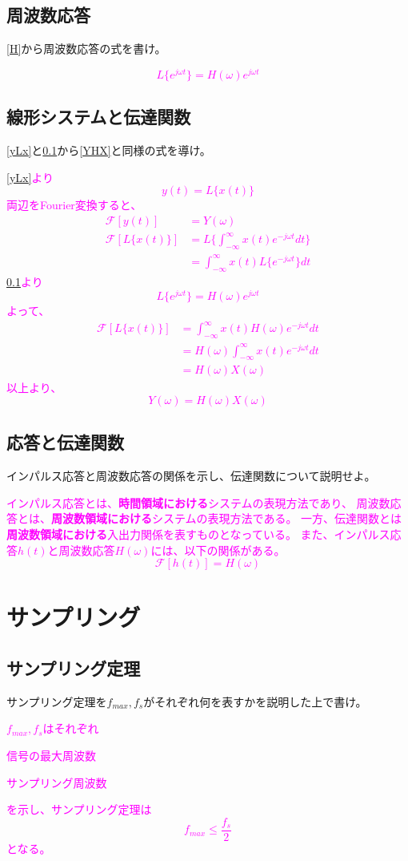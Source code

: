 \documentclass[twocolumn]{ltjsarticle}
\newcommand{\visible}{visible}
\newcommand{\ans}[1]{
\begin{tcolorbox}[\visible]
\textcolor{magenta}{#1}
\end{tcolorbox}
}
\begin{document}
\subsection{周波数応答}\label{He}
\ref{H}から周波数応答の式を書け。
\ans{
    $$L\{e^{j\omega t}\}=H(\omega)e^{j\omega t}$$
}
\subsection{線形システムと伝達関数}
\ref{yLx}と\ref{He}から\ref{YHX}と同様の式を導け。
\ans{
    \ref{yLx}より$$y(t)=L\{x(t)\}$$
    両辺をFourier変換すると、
    \begin{align*}
        \mathcal{F}[y(t)]&=Y(\omega)\\
        \mathcal{F}[L\{x(t)\}]&=L\{\int_{-\infty}^{\infty}x(t)e^{-j\omega t}dt\}\\
        &=\int_{-\infty}^{\infty}x(t)L\{e^{-j\omega t}\}dt
    \end{align*}
    \ref{He}より$$L\{e^{j\omega t}\}=H(\omega)e^{j\omega t}$$
    よって、
    \begin{align*}
        \mathcal{F}[L\{x(t)\}]&=\int_{-\infty}^{\infty}x(t)H(\omega)e^{-j\omega t}dt\\
        &=H(\omega)\int_{-\infty}^{\infty}x(t)e^{-j\omega t}dt\\
        &=H(\omega)X(\omega)
    \end{align*}
    以上より、
    $$Y(\omega)=H(\omega)X(\omega)$$
}
\subsection{応答と伝達関数}
インパルス応答と周波数応答の関係を示し、伝達関数について説明せよ。
\ans{
    インパルス応答とは、\textbf{時間領域における}システムの表現方法であり、
    周波数応答とは、\textbf{周波数領域における}システムの表現方法である。
    一方、伝達関数とは\textbf{周波数領域における}入出力関係を表すものとなっている。
    また、インパルス応答$h(t)$と周波数応答$H(\omega)$には、以下の関係がある。
    $$\mathcal{F}[h(t)]=H(\omega)$$
}
\clearpage
\section{サンプリング}
\subsection{サンプリング定理}
サンプリング定理を$f_{max},f_s$がそれぞれ何を表すかを説明した上で書け。
\ans{
    $f_{max},f_s$はそれぞれ
    \begin{description}
        \centering
        \item[$f_{max}$]信号の最大周波数
        \item[$f_s$]サンプリング周波数  
    \end{description}
    を示し、サンプリング定理は
    $$f_{max}\leq\frac{f_s}{2}$$
    となる。
}
\end{document}
